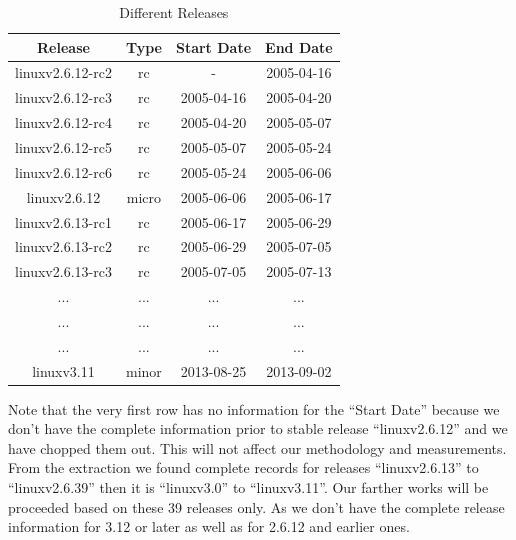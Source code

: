 \documentclass{acm_proc_article-sp}
\begin{document}
\begin{table}[ht]
\caption{Different Releases}  %
\centering 						%
\begin{tabular}{c c c c}				%
\hline\hline						%
Release & Type & Start Date & End Date \\ [0.5ex]
\hline 							%
linuxv2.6.12-rc2 & rc       & - & 2005-04-16 \\
linuxv2.6.12-rc3 & rc       & 2005-04-16 & 2005-04-20 \\
linuxv2.6.12-rc4 & rc       & 2005-04-20 & 2005-05-07 \\
linuxv2.6.12-rc5 & rc       & 2005-05-07 & 2005-05-24 \\
linuxv2.6.12-rc6 & rc       & 2005-05-24 & 2005-06-06 \\
linuxv2.6.12        & micro & 2005-06-06 & 2005-06-17 \\
linuxv2.6.13-rc1 & rc       & 2005-06-17 & 2005-06-29 \\
linuxv2.6.13-rc2 & rc       & 2005-06-29 & 2005-07-05 \\
linuxv2.6.13-rc3 & rc       & 2005-07-05 & 2005-07-13 \\
...			     & ...	   & ... 		     & ...\\
...			     & ...	   & ... 		     & ... \\
...			     & ...	   & ... 		     & ... \\
linuxv3.11            & minor & 2013-08-25 & 2013-09-02 \\
[1ex]							%
\hline 							%
\end{tabular}
\label{table:nonlin} 				%
\end{table}

Note that the very first row has no information for the ``Start Date'' because we don't have the  complete information prior to stable release ``linuxv2.6.12'' and we have chopped them out. This will not affect our methodology and measurements. From the extraction we found complete records for releases ``linuxv2.6.13'' to ``linuxv2.6.39'' then it is ``linuxv3.0'' to ``linuxv3.11''. Our farther works will be proceeded based on these 39 releases only. As we don't have the complete release information for 3.12 or later as well as for 2.6.12 and earlier ones.
\end{document}
